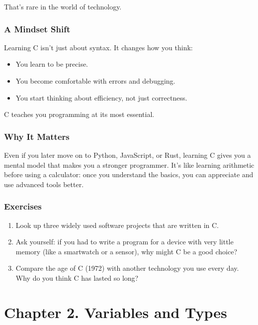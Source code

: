 \documentclass[
  letterpaper,
  DIV=11,
  numbers=noendperiod]{scrreprt}
\providecommand{\tightlist}{%
  \setlength{\itemsep}{0pt}\setlength{\parskip}{0pt}}
\begin{document}
That's rare in the world of technology.

\subsubsection{A Mindset Shift}\label{a-mindset-shift}

Learning C isn't just about syntax. It changes how you think:

\begin{itemize}
\tightlist
\item
  You learn to be precise.
\item
  You become comfortable with errors and debugging.
\item
  You start thinking about efficiency, not just correctness.
\end{itemize}

C teaches you programming at its most essential.

\subsubsection{Why It Matters}\label{why-it-matters-4}

Even if you later move on to Python, JavaScript, or Rust, learning C
gives you a mental model that makes you a stronger programmer. It's like
learning arithmetic before using a calculator: once you understand the
basics, you can appreciate and use advanced tools better.

\subsubsection{Exercises}\label{exercises-4}

\begin{enumerate}
\def\labelenumi{\arabic{enumi}.}
\tightlist
\item
  Look up three widely used software projects that are written in C.
\item
  Ask yourself: if you had to write a program for a device with very
  little memory (like a smartwatch or a sensor), why might C be a good
  choice?
\item
  Compare the age of C (1972) with another technology you use every day.
  Why do you think C has lasted so long?
\end{enumerate}

\section{Chapter 2. Variables and
Types}\label{chapter-2.-variables-and-types}
\end{document}
